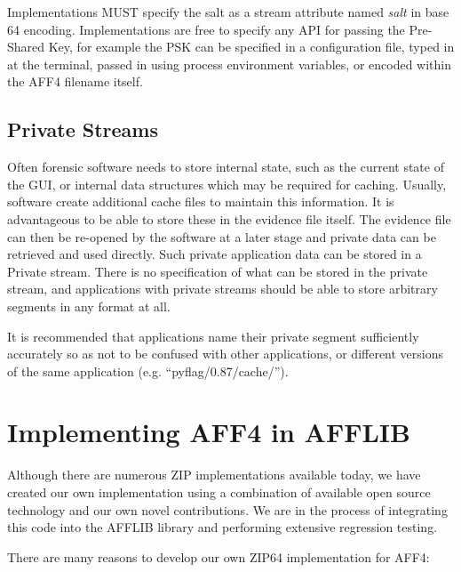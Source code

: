 \documentclass[10pt, conference]{IEEEtran}
\begin{document}
Implementations MUST specify the salt as a stream attribute named {\em
salt} in base 64 encoding. Implementations are free to specify any API
for passing the Pre-Shared Key, for example the PSK can be specified
in a configuration file, typed in at the terminal, passed in using
process environment variables, or encoded within the AFF4 filename
itself.

\subsection{Private Streams}
Often forensic software needs to store internal state, such as the
current state of the GUI, or internal data structures which may be
required for caching. Usually, software create additional cache files
to maintain this information. It is advantageous to be able to store
these in the evidence file itself. The evidence file can then be
re-opened by the software at a later stage and private data can be
retrieved and used directly. Such private application data can be
stored in a Private stream. There is no specification of what can be
stored in the private stream, and applications with private streams
should be able to store arbitrary segments in any format at all.

It is recommended that applications name their private segment
sufficiently accurately so as not to be confused with other
applications, or different versions of the same application
(e.g. ``pyflag/0.87/cache/'').


\section{Implementing AFF4 in AFFLIB}
Although there are numerous ZIP implementations available
today, we have created our own implementation using a combination of
available open source technology and our own novel contributions. We
are in the process of integrating this code into the AFFLIB library
and performing extensive regression testing. 

There are many reasons to develop our own ZIP64 implementation for
AFF4:
\end{document}
